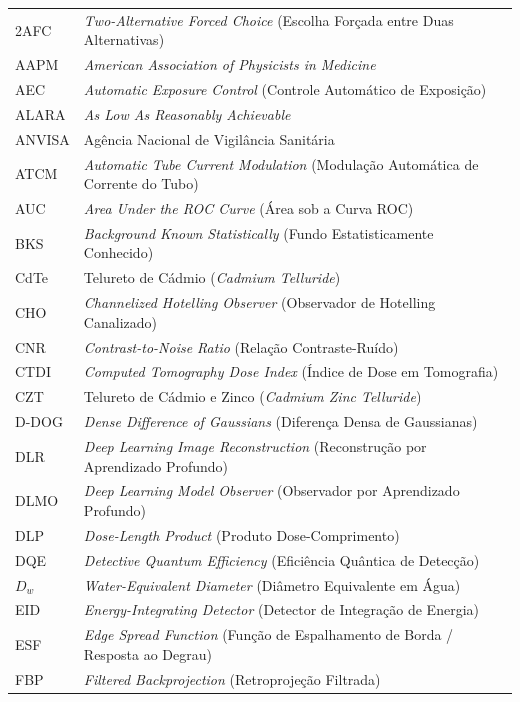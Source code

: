 \documentclass[
  12pt,
  a4paper,
  oneside
]{report}
\begin{document}
\begin{longtable}{p{}p{}}
  2AFC   & \emph{Two-Alternative Forced Choice} (Escolha Forçada entre Duas Alternativas) \\
  AAPM   & \emph{American Association of Physicists in Medicine} \\
  AEC    & \emph{Automatic Exposure Control} (Controle Automático de Exposição) \\
  ALARA  & \emph{As Low As Reasonably Achievable} \\
  ANVISA & Agência Nacional de Vigilância Sanitária \\
  ATCM   & \emph{Automatic Tube Current Modulation} (Modulação Automática de Corrente do Tubo) \\
  AUC    & \emph{Area Under the ROC Curve} (Área sob a Curva ROC) \\
  BKS    & \emph{Background Known Statistically} (Fundo Estatisticamente Conhecido) \\
  CdTe   & Telureto de Cádmio (\emph{Cadmium Telluride}) \\
  CHO    & \emph{Channelized Hotelling Observer} (Observador de Hotelling Canalizado) \\
  CNR    & \emph{Contrast-to-Noise Ratio} (Relação Contraste-Ruído) \\
  CTDI   & \emph{Computed Tomography Dose Index} (Índice de Dose em Tomografia) \\
  CZT    & Telureto de Cádmio e Zinco (\emph{Cadmium Zinc Telluride}) \\
  D-DOG  & \emph{Dense Difference of Gaussians} (Diferença Densa de Gaussianas) \\
  DLR    & \emph{Deep Learning Image Reconstruction} (Reconstrução por Aprendizado Profundo) \\
  DLMO   & \emph{Deep Learning Model Observer} (Observador por Aprendizado Profundo) \\
  DLP    & \emph{Dose-Length Product} (Produto Dose-Comprimento) \\
  DQE    & \emph{Detective Quantum Efficiency} (Eficiência Quântica de Detecção) \\
  $D_w$  & \emph{Water-Equivalent Diameter} (Diâmetro Equivalente em Água) \\
  EID    & \emph{Energy-Integrating Detector} (Detector de Integração de Energia) \\
  ESF    & \emph{Edge Spread Function} (Função de Espalhamento de Borda / Resposta ao Degrau) \\
  FBP    & \emph{Filtered Backprojection} (Retroprojeção Filtrada) \\

\end{longtable}
\end{document}
